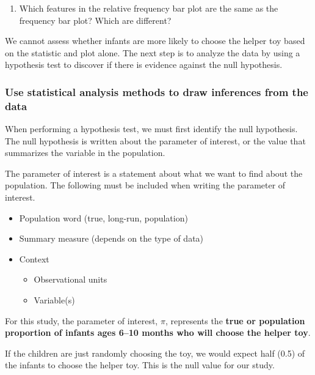 \documentclass[
]{report}
\providecommand{\tightlist}{%
  \setlength{\itemsep}{0pt}\setlength{\parskip}{0pt}}
\begin{document}
\begin{enumerate}
\def\labelenumi{\arabic{enumi}.}
\setcounter{enumi}{4}
\tightlist
\item
  Which features in the relative frequency bar plot are the same as the frequency bar plot? Which are different?
\end{enumerate}

\vspace{0.5in}

We cannot assess whether infants are more likely to choose the helper toy based on the statistic and plot alone. The next step is to analyze the data by using a hypothesis test to discover if there is evidence against the null hypothesis.

\subsubsection*{Use statistical analysis methods to draw inferences from the data}\label{use-statistical-analysis-methods-to-draw-inferences-from-the-data}

When performing a hypothesis test, we must first identify the null hypothesis. The null hypothesis is written about the parameter of interest, or the value that summarizes the variable in the population.

The parameter of interest is a statement about what we want to find about the population. The following must be included when writing the parameter of interest.

\begin{itemize}
\item
  Population word (true, long-run, population)
\item
  Summary measure (depends on the type of data)
\item
  Context

  \begin{itemize}
  \item
    Observational units
  \item
    Variable(s)
  \end{itemize}
\end{itemize}

For this study, the parameter of interest, \(\pi\), represents the \textbf{true or population proportion of infants ages 6--10 months who will choose the helper toy}.

If the children are just randomly choosing the toy, we would expect half (0.5) of the infants to choose the helper toy. This is the null value for our study.
\end{document}
